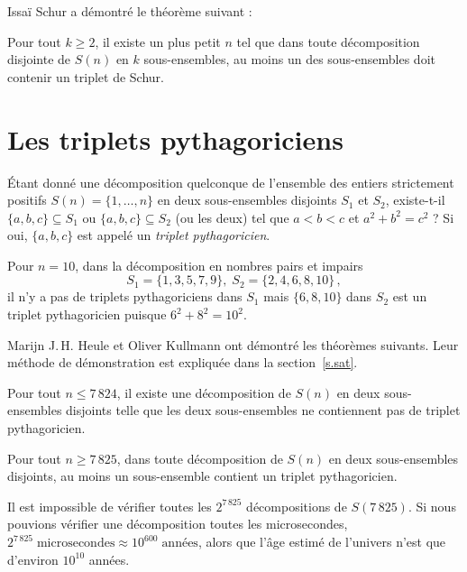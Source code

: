  Issaï Schur a démontré le théorème suivant :
\begin{theorem}[Schur]
Pour tout $k\geq 2$, il existe un plus petit $n$ tel que dans toute décomposition disjointe de $S(n)$ en $k$ sous-ensembles, au moins un des sous-ensembles doit contenir un triplet de Schur.
\end{theorem}


\section{Les triplets pythagoriciens  }\label{s.pyth}

\begin{definition}
Étant donné une décomposition quelconque de l'ensemble des  entiers strictement positifs $S(n)=\{1,\ldots,n\}$ 
en deux sous-ensembles disjoints $S_1$ et $S_2$, existe-t-il $\{a,b,c\}\subseteq S_1$ ou $\{a,b,c\}\subseteq S_2$ (ou les deux) tel que $a\!<\!b\!<\!c$ et $a^2+b^2=c^2$ ? Si oui, $\{a,b,c\}$ est appelé un \emph{triplet pythagoricien}.
\end{definition}

\begin{example}
Pour $n=10$, dans la décomposition en nombres pairs et impairs 
\[
S_1 = \{1,3,5,7,9\},\; S_2=\{2,4,6,8,10\}\,,
\]
il n'y a pas de triplets pythagoriciens dans $S_1$ mais $\{6,8,10\}$ dans $S_2$ est un triplet pythagoricien puisque $6^2+8^2=10^2$.
\end{example}

Marijn J.\,H. Heule et Oliver Kullmann ont démontré les théorèmes suivants. Leur méthode de démonstration est expliquée dans la section~\ref{s.sat}.

\begin{theorem}
Pour tout $n\leq 7\,824$, il existe une  décomposition de $S(n)$ en deux sous-ensembles disjoints telle que les deux sous-ensembles ne contiennent pas de triplet pythagoricien.
\end{theorem}

\begin{theorem}
Pour tout $n\geq 7\,825$, dans toute décomposition de $S(n)$ en deux sous-ensembles disjoints, au moins un sous-ensemble contient un triplet pythagoricien.
\end{theorem}
Il est impossible de vérifier toutes les $2^{7\,825}$ décompositions de $S(7\,825)$. Si nous pouvions vérifier une décomposition toutes les microsecondes, $2^{7\,825}\; \textrm{microsecondes}\approx 10^{600}\; \textrm{années}$, alors que l'âge estimé de l'univers n'est que d'environ $10^{10}$ années.



